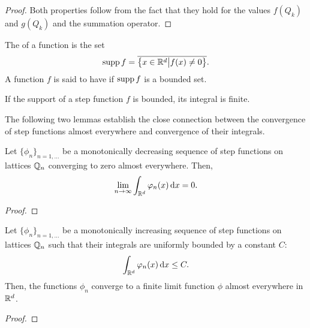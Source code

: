 \begin{proof}
  Both properties follow from the fact that they hold for the values
  $f(Q_k)$ and $g(Q_k)$ and the summation operator.
\end{proof}

\begin{definition}
  The  of a function is the set
  \begin{gather}
    \operatorname{supp} f = \overline{
      \bigl\{x\in \mathbb R^d\big| f(x) \neq 0 \bigr\}}.
  \end{gather}
  A function $f$ is said to have  if $\operatorname{supp} f$
  is a bounded set.
\end{definition}

\begin{note}
  If the support of a step function $f$ is bounded, its integral is finite.
\end{note}

The following two lemmas establish the close connection between the
convergence of step functions almost everywhere and convergence of
their integrals.

\begin{lemma}
  \label{lemma:integral:1}
  Let $\{\phi_n\}_{n=1,\dots}$ be a monotonically decreasing sequence
  of step functions on lattices $\mathbb Q_n$ converging to zero almost
  everywhere. Then,
  \begin{gather*}
    \lim_{n\to \infty}\int_{\mathbb R^d} \varphi_n(x) \,\mathrm{d} x = 0.
  \end{gather*}
\end{lemma}

\begin{todo}
  \begin{proof}
    
  \end{proof}
\end{todo}

\begin{lemma}
  \label{lemma:integral:2}
  Let $\{\phi_n\}_{n=1,\dots}$ be a monotonically increasing sequence
  of step functions on lattices $\mathbb Q_n$ such that their integrals are
  uniformly bounded by a constant $C$:
  \begin{gather}
    \label{eq:integral:1}
    \int_{\mathbb R^d} \varphi_n(x) \,\mathrm{d} x \le C.
  \end{gather}
  Then, the functions $\phi_n$ converge to a finite limit function
  $\phi$ almost everywhere in $\mathbb R^d$.
\end{lemma}

\begin{todo}
  \begin{proof}
    
  \end{proof}
\end{todo}

